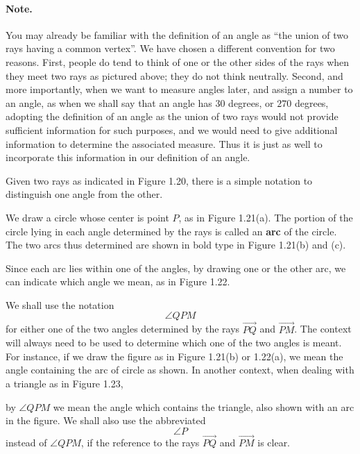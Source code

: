 \documentclass[12pt]{book} %
\begin{document}
\paragraph{Note.}
You may already be familiar with the definition of an angle as ``the union of two rays having a common vertex''. We have chosen a different convention for two reasons. First, people do tend to think of one or the other sides of the rays when they meet two rays as pictured above; they do not think neutrally. Second, and more importantly, when we want to measure angles later, and assign a number to an angle, as when we shall say that an angle has $30$ degrees, or $270$ degrees, adopting the definition of an angle as the union of two rays would not provide sufficient information for such purposes, and we would need to give additional information to determine the associated measure. Thus it is just as well to incorporate this information in our definition of an angle.

Given two rays as indicated in Figure 1.20, there is a simple notation to distinguish one angle from the other.


We draw a circle whose center is point $P$, as in Figure 1.21(a). The portion of the circle lying in each angle determined by the rays is called an \textbf{arc} of the circle. The two arcs thus determined are shown in bold type in Figure 1.21(b) and (c).


Since each arc lies within one of the angles, by drawing one or the other arc, we can indicate which angle we mean, as in Figure 1.22.


We shall use the notation
\[
\angle QPM
\]
for either one of the two angles determined by the rays $\overrightarrow{PQ}$ and $\overrightarrow{PM}$. The context will always need to be used to determine which one of the two angles is meant. For instance, if we draw the figure as in Figure 1.21(b) or 1.22(a), we mean the angle containing the arc of circle as shown. In another context, when dealing with a triangle as in Figure 1.23,


by $\angle QPM$ we mean the angle which contains the triangle, also shown with an arc in the figure. We shall also use the abbreviated
\[
\angle P
\]
instead of $\angle QPM$, if the reference to the rays $\overrightarrow{PQ}$ and $\overrightarrow{PM}$ is clear.
\end{document}
